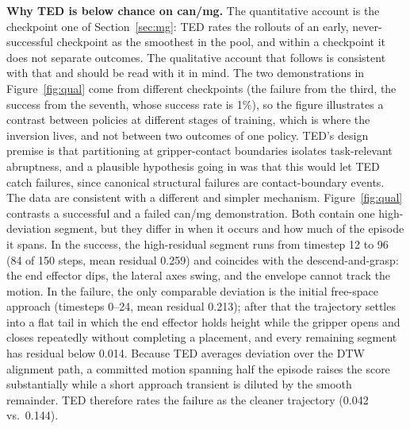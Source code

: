 \documentclass[10pt]{article}
\begin{document}
\textbf{Why TED is below chance on can/mg.} The quantitative account is the
checkpoint one of Section~\ref{sec:mg}: TED rates the rollouts of an early,
never-successful checkpoint as the smoothest in the pool, and within a
checkpoint it does not separate outcomes. The qualitative account that
follows is consistent with that and should be read with it in mind. The two
demonstrations in Figure~\ref{fig:qual} come from different checkpoints (the
failure from the third, the success from the seventh, whose success rate
is 1\%), so the figure
illustrates a contrast between policies at different stages of training,
which is where the inversion lives, and not between two outcomes of one
policy. TED's design premise is that
partitioning at gripper-contact boundaries isolates task-relevant
abruptness, and a plausible hypothesis going in was that this would let TED
catch failures, since canonical structural failures are contact-boundary
events. The data are consistent with a different and simpler mechanism.
Figure~\ref{fig:qual} contrasts a successful and a failed can/mg
demonstration. Both contain one high-deviation segment, but they differ in
when it occurs and how much of the episode it spans. In the success, the
high-residual segment runs from timestep 12 to 96 (84 of 150 steps, mean
residual 0.259) and coincides with the descend-and-grasp: the end effector
dips, the lateral axes swing, and the envelope cannot track the motion. In
the failure, the only comparable deviation is the initial free-space
approach (timesteps 0--24, mean residual 0.213); after that the trajectory
settles into a flat tail in which the end effector holds height while the
gripper opens and closes repeatedly without completing a placement, and
every remaining segment has residual below 0.014. Because TED averages
deviation over the DTW alignment path, a committed motion spanning half the
episode raises the score substantially while a short approach transient is
diluted by the smooth remainder. TED therefore rates the failure as the
cleaner trajectory (0.042 vs.\ 0.144).
\end{document}
